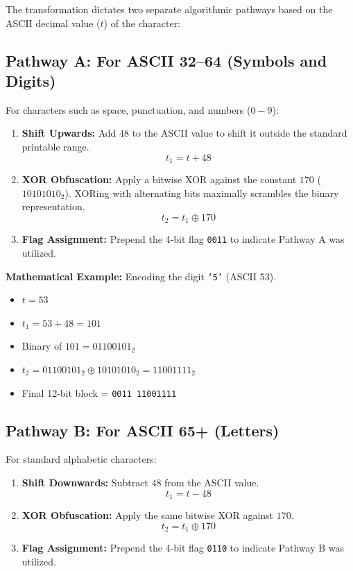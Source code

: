 \documentclass[12pt,a4paper]{report}
\begin{document}
The transformation dictates two separate algorithmic pathways based on the ASCII decimal value ($t$) of the character:

\subsection{Pathway A: For ASCII 32–64 (Symbols and Digits)}
For characters such as space, punctuation, and numbers ($0-9$):
\begin{enumerate}
    \item \textbf{Shift Upwards:} Add 48 to the ASCII value to shift it outside the standard printable range.
    $$ t_1 = t + 48 $$
    \item \textbf{XOR Obfuscation:} Apply a bitwise XOR against the constant $170$ ($10101010_2$). XORing with alternating bits maximally scrambles the binary representation.
    $$ t_2 = t_1 \oplus 170 $$
    \item \textbf{Flag Assignment:} Prepend the 4-bit flag \texttt{0011} to indicate Pathway A was utilized.
\end{enumerate}

\textbf{Mathematical Example:} Encoding the digit \texttt{'5'} (ASCII 53).
\begin{itemize}
    \item $t = 53$
    \item $t_1 = 53 + 48 = 101$
    \item Binary of $101 = 01100101_2$
    \item $t_2 = 01100101_2 \oplus 10101010_2 = 11001111_2$
    \item Final 12-bit block = \texttt{0011 11001111}
\end{itemize}

\subsection{Pathway B: For ASCII 65+ (Letters)}
For standard alphabetic characters:
\begin{enumerate}
    \item \textbf{Shift Downwards:} Subtract 48 from the ASCII value.
    $$ t_1 = t - 48 $$
    \item \textbf{XOR Obfuscation:} Apply the same bitwise XOR against $170$.
    $$ t_2 = t_1 \oplus 170 $$
    \item \textbf{Flag Assignment:} Prepend the 4-bit flag \texttt{0110} to indicate Pathway B was utilized.
\end{enumerate}
\end{document}
